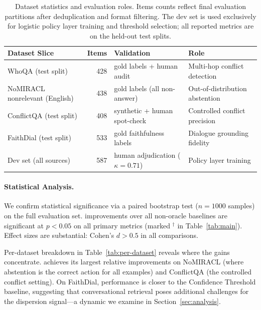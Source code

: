 \begin{table}[t]
\centering
\small
\begin{tabular}{lrlL{3.2cm}}
\toprule
Dataset Slice & Items & Validation & Role \\
\midrule
WhoQA (test split)             &  428 & gold labels + human audit    & Multi-hop conflict detection \\
NoMIRACL nonrelevant (English) &  438 & gold labels (all non-answer)  & Out-of-distribution abstention \\
ConflictQA (test split)        &  408 & synthetic + human spot-check  & Controlled conflict precision \\
FaithDial (test split)         &  533 & gold faithfulness labels       & Dialogue grounding fidelity \\
Dev set (all sources)          &  587 & human adjudication ($\kappa=0.71$) & Policy layer training \\
\bottomrule
\end{tabular}
\caption{Dataset statistics and evaluation roles. Items counts reflect final evaluation partitions after deduplication and format filtering. The dev set is used exclusively for logistic policy layer training and threshold selection; all reported metrics are on the held-out test splits.}
\label{tab:dataset-matrix}
\end{table}

\paragraph{Statistical Analysis.} We confirm statistical significance via a paired bootstrap test ($n{=}1000$ samples) on the full evaluation set. \method{} improvements over all non-oracle baselines are significant at $p{<}0.05$ on all primary metrics (marked $^{\dagger}$ in Table~\ref{tab:main}). Effect sizes are substantial: Cohen's $d > 0.5$ in all comparisons.

Per-dataset breakdown in Table~\ref{tab:per-dataset} reveals where the gains concentrate. \method{} achieves its largest relative improvements on NoMIRACL (where abstention is the correct action for all examples) and ConflictQA (the controlled conflict setting). On FaithDial, performance is closer to the Confidence Threshold baseline, suggesting that conversational retrieval poses additional challenges for the dispersion signal---a dynamic we examine in Section~\ref{sec:analysis}.

